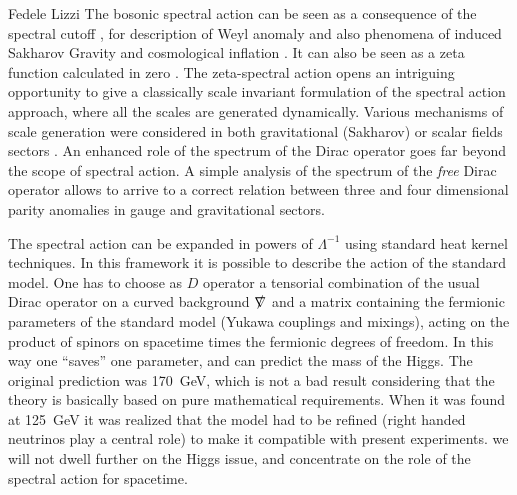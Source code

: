 \begin{artengenv}{Fedele Lizzi}
The bosonic spectral action can be seen as a consequence of the spectral cutoff \parencite{Andrianov:2010nr,Andrianov:2011bc,Kurkov:2012dn}, for description of Weyl anomaly and also phenomena of induced Sakharov Gravity \parencite{Sakharov} and cosmological inflation \parencite{Kurkov:2013gma}. It can also be seen as a zeta function calculated in zero \parencite{zeta}. The zeta-spectral action opens an intriguing opportunity to give a classically scale invariant formulation of the spectral action approach, where all the scales are generated dynamically.  Various mechanisms of scale generation were considered in both gravitational (Sakharov) or scalar fields sectors \parencite{ripples}. An enhanced role of the spectrum of the Dirac operator goes  far beyond the scope of spectral action. A simple analysis of the spectrum of the \emph{free} Dirac operator allows to arrive to a correct relation between three and four dimensional parity anomalies in gauge \parencite{Kurkov:2017cdz} and gravitational \parencite{Kurkov:2018pjw} sectors.





The spectral action can be expanded in powers of $\Lambda^{-1}$ using standard heat kernel techniques.
In this framework it is possible to describe the action of the standard model.
One has to choose as $D$ operator a tensorial combination of the usual Dirac operator on a curved background  $\slashed\nabla$ and a matrix containing the fermionic parameters of the standard model (Yukawa couplings and mixings), acting on the product of spinors on spacetime times the fermionic degrees of freedom. In this way one ``saves'' one parameter, and can predict the mass of the Higgs. The original prediction was 170~GeV, which is not a bad result considering that the theory is basically based on pure mathematical requirements. When it was found at 125~GeV it was realized that the model had to be refined (right handed neutrinos play a central role) to make it compatible with present experiments. 
we will not dwell further on the Higgs issue, and concentrate on the role of the spectral action for spacetime.


\end{artengenv}
